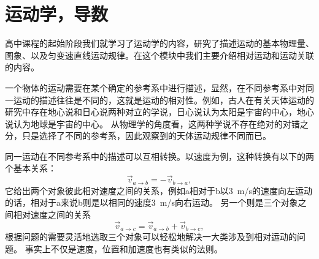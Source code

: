 

\chapter{运动学，导数}

高中课程的起始阶段我们就学习了运动学的内容，研究了描述运动的基本物理量、图象、以及匀变速直线运动规律。在这个模块中我们主要介绍相对运动和运动关联的内容。


一个物体的运动需要在某个确定的参考系中进行描述，显然，在不同参考系中对同一运动的描述往往是不同的，这就是运动的相对性。例如，古人在有关天体运动的研究中存在地心说和日心说两种对立的学说，日心说认为太阳是宇宙的中心，地心说认为地球是宇宙的中心。
从物理学的角度看，这两种学说不存在绝对的对错之分，只是选择了不同的参考系，因此观察到的天体运动规律不同而已。

同一运动在不同参考系中的描述可以互相转换。以速度为例，这种转换有以下的两个基本关系：
\begin{equation}\label{key}
\vec{v}_{a\rightarrow b} = -\vec{v}_{b\rightarrow a},
\end{equation}
它给出两个对象彼此相对速度之间的关系，例如a相对于b以\SI{3}{m/s}的速度向左运动的话，相对于a来说b则是以相同的速度\SI{3}{m/s}向右运动。
另一个则是三个对象之间相对速度之间的关系
\begin{equation}\label{key}
\vec{v}_{a\rightarrow c} = \vec{v}_{a\rightarrow b}+\vec{v}_{b\rightarrow c},
\end{equation}
根据问题的需要灵活地选取三个对象可以轻松地解决一大类涉及到相对运动的问题。
事实上不仅是速度，位置和加速度也有类似的法则。





